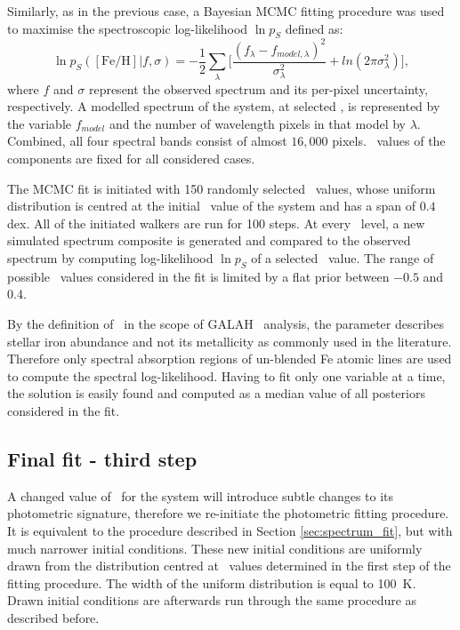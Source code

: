 Similarly, as in the previous case, a Bayesian MCMC fitting procedure was used to maximise the spectroscopic \hbox{log-likelihood} $\ln p_{S}$ defined as:
\begin{equation}
	\label{equ:lnp_s}
	\ln p_{S}(\mathrm{[Fe/H]} | f, \sigma) = -\frac{1}{2} \sum_{\lambda}^{} \Big[ \frac{(f_{\lambda} - f_{model, \lambda})^2}{\sigma_{\lambda}^2} +ln(2\pi\sigma_{\lambda}^2) \Big],
\end{equation}
where $f$ and $\sigma$ represent the observed spectrum and its per-pixel uncertainty, respectively. A modelled spectrum of the system, at selected \Feh, is represented by the variable $f_{model}$ and the number of wavelength pixels in that model by $\lambda$. Combined, all four spectral bands consist of almost $16,000$ pixels. \Teff\ values of the components are fixed for all considered cases.

The MCMC fit is initiated with 150 randomly selected \Feh\ values, whose uniform distribution is centred at the initial \Feh\ value of the system and has a span of $0.4$ dex. All of the initiated walkers are run for 100 steps. At every \Feh\ level, a new simulated spectrum composite is generated and compared to the observed spectrum by computing log-likelihood $\ln p_{S}$ of a selected \Feh\ value. The range of possible \Feh\ values considered in the fit is limited by a flat prior between $-0.5$ and $0.4$. 

By the definition of \Feh\ in the scope of GALAH \TC\ analysis, the parameter describes stellar iron abundance and not its metallicity as commonly used in the literature. Therefore only spectral absorption regions of un-blended Fe atomic lines are used to compute the spectral log-likelihood. Having to fit only one variable at a time, the solution is easily found and computed as a median value of all posteriors considered in the fit.

\subsection{Final fit - third step}
\label{sec:final_fit}
A changed value of \Feh\ for the system will introduce subtle changes to its photometric signature, therefore we re-initiate the photometric fitting procedure. It is equivalent to the procedure described in Section \ref{sec:spectrum_fit}, but with much narrower initial conditions. These new initial conditions are uniformly drawn from the distribution centred at \Teff\ values determined in the first step of the fitting procedure. The width of the uniform distribution is equal to 100~K. Drawn initial conditions are afterwards run through the same procedure as described before.

